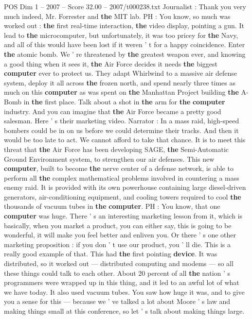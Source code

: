 \begin{textsample}{POS Dim 1 – 2007 – Score 32.00 – 2007/t000238.txt}
Journalist : Thank you very much indeed, Mr.
Forrester and \textbf{the} MIT lab.
PH : You know, so much was worked out : \textbf{the} first real-time interaction, \textbf{the} video display, pointing a gun.
It lead to \textbf{the} microcomputer, but unfortunately, it was too pricey for \textbf{the} Navy, and all of this would have been lost if it weren ' t for a happy coincidence.
Enter \textbf{the} atomic bomb.
We ' re threatened by \textbf{the} greatest weapon ever, and knowing a good thing when it sees it, \textbf{the} Air Force decides it needs \textbf{the} biggest \textbf{computer} ever to protect us.
They adapt Whirlwind to a massive air defense system, deploy it all across \textbf{the} frozen north, and spend nearly three times as much on this \textbf{computer} as was spent on \textbf{the} Manhattan Project building \textbf{the} A-Bomb in \textbf{the} first place.
Talk about a shot in \textbf{the} arm for \textbf{the} \textbf{computer} industry.
And you can imagine that \textbf{the} Air Force became a pretty good salesman.
Here ' s their marketing video.
Narrator : In a mass raid, high-speed bombers could be in on us before we could determine their tracks.
And then it would be too late to act.
We cannot afford to take that chance.
It is to meet this threat that \textbf{the} Air Force has been developing SAGE, \textbf{the} Semi-Automatic Ground Environment system, to strengthen our air defenses.
This new \textbf{computer}, built to become \textbf{the} nerve center of a defense network, is able to perform all \textbf{the} complex mathematical problems involved in countering a mass enemy raid.
It is provided with its own powerhouse containing large diesel-driven generators, air-conditioning equipment, and cooling towers required to cool \textbf{the} thousands of vacuum tubes in \textbf{the} \textbf{computer}.
PH : You know, that one \textbf{computer} was huge.
There ' s an interesting marketing lesson from it, which is basically, when you market a product, you can either say, this is going to be wonderful, it will make you feel better and enliven you.
Or there ' s one other marketing proposition : if you don ' t use our product, you ' ll die.
This is a really good example of that.
This had \textbf{the} first pointing \textbf{device}.
It was distributed, so it worked out — distributed computing and modems — so all these things could talk to each other.
About 20 percent of all \textbf{the} nation ' s programmers were wrapped up in this thing, and it led to an awful lot of what we have today.
It also used vacuum tubes.
You saw how huge it was, and to give you a sense for this — because we ' ve talked a lot about Moore ' s law and making things small at this conference, so let ' s talk about making things large.

\end{textsample}
